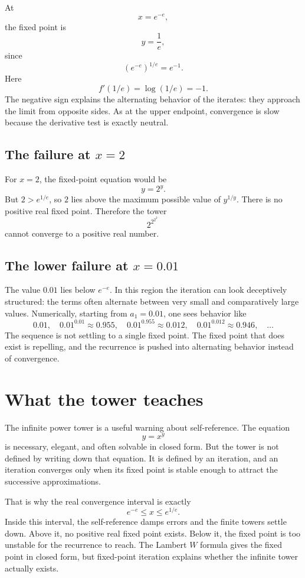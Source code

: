 \documentclass{essay}
\begin{document}
At
\[
  x=e^{-e},
\]
the fixed point is
\[
  y=\frac1e,
\]
since
\[
  \left(e^{-e}\right)^{1/e}=e^{-1}.
\]
Here
\[
  f'(1/e)=\log(1/e)=-1.
\]
The negative sign explains the alternating behavior of the iterates: they
approach the limit from opposite sides. As at the upper endpoint, convergence
is slow because the derivative test is exactly neutral.

\subsection*{The failure at \(x=2\)}

For \(x=2\), the fixed-point equation would be
\[
  y=2^y.
\]
But \(2>e^{1/e}\), so \(2\) lies above the maximum possible value of
\(y^{1/y}\). There is no positive real fixed point. Therefore the tower
\[
  2^{2^{2^{2^{\cdots}}}}
\]
cannot converge to a positive real number.

\subsection*{The lower failure at \(x=0.01\)}

The value \(0.01\) lies below \(e^{-e}\). In this region the iteration can
look deceptively structured: the terms often alternate between very small
and comparatively large values. Numerically, starting from \(a_1=0.01\),
one sees behavior like
\[
  0.01,\quad
  0.01^{0.01}\approx0.955,\quad
  0.01^{0.955}\approx0.012,\quad
  0.01^{0.012}\approx0.946,\quad\ldots
\]
The sequence is not settling to a single fixed point. The fixed point that
does exist is repelling, and the recurrence is pushed into alternating
behavior instead of convergence.

\section{What the tower teaches}

The infinite power tower is a useful warning about self-reference. The equation
\[
  y=x^y
\]
is necessary, elegant, and often solvable in closed form. But the tower is not
defined by writing down that equation. It is defined by an iteration, and an
iteration converges only when its fixed point is stable enough to attract the
successive approximations.

That is why the real convergence interval is exactly
\[
  e^{-e}\le x\le e^{1/e}.
\]
Inside this interval, the self-reference damps errors and the finite towers
settle down. Above it, no positive real fixed point exists. Below it, the
fixed point is too unstable for the recurrence to reach. The Lambert \(W\)
formula gives the fixed point in closed form, but fixed-point iteration
explains whether the infinite tower actually exists.
\end{document}
